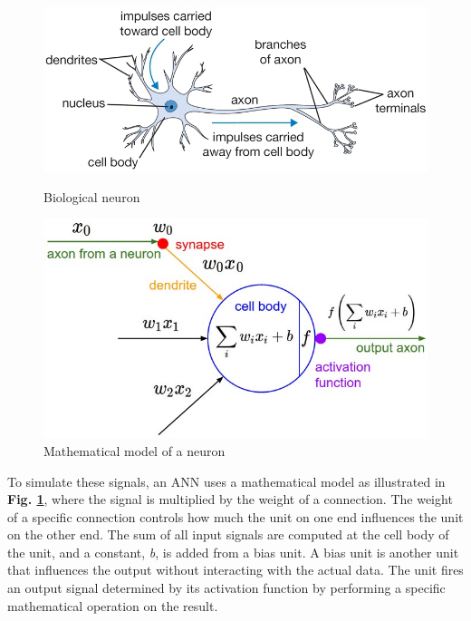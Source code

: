 \begin{figure}
    \begin{minipage}{0.5\textwidth}
        \centering
            \includegraphics[width=1\textwidth]{fig/neuron}
            \caption{Biological neuron \cite{cs231n_part1}}
            \label{fig1}
    \end{minipage}
    \begin{minipage}{0.4\textwidth}
        \centering
            \includegraphics[width=1\textwidth]{fig/neuron_model}
            \caption{Mathematical model of a neuron\cite{cs231n_part1}}
            \label{fig2}
    \end{minipage}
\end{figure}

\noindent To simulate these signals, an ANN uses a mathematical model as illustrated in \textbf{Fig. \ref{fig2}}, where the signal is multiplied by the weight of a connection. The weight of a specific connection controls how much the unit on one end influences the unit on the other end. The sum of all input signals are computed at the cell body of the unit, and a constant, \textit{b}, is added from a bias unit. A bias unit is another unit that influences the output without interacting with the actual data. The unit fires an output signal determined by its activation function by performing a specific mathematical operation on the result.


